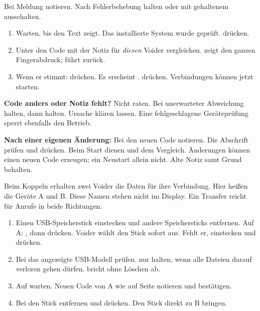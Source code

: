 Bei  Meldung notieren. Nach Fehlerbehebung  halten oder mit gehaltenem  ausschalten.

\begin{enumerate}
\item Warten, bis  den Text  zeigt. Das installierte System wurde geprüft.  drücken.
\item Unter  den Code mit der Notiz für \emph{diesen} Voider vergleichen.  zeigt den ganzen Fingerabdruck;  führt zurück.
\item Wenn er stimmt:  drücken. Es erscheint .  drücken. Verbindungen können jetzt starten.
\end{enumerate}
\textbf{Code anders oder Notiz fehlt?} Nicht raten. Bei unerwarteter Abweichung  halten, dann  halten. Ursache klären lassen. Eine fehlgeschlagene Geräteprüfung sperrt ebenfalls den Betrieb.

\textbf{Nach einer eigenen Änderung:} Bei  den neuen Code notieren. Die Abschrift prüfen und  drücken. Beim Start dienen  und  dem Vergleich. Änderungen können einen neuen Code erzeugen; ein Neustart allein nicht. Alte Notiz samt Grund behalten.

Beim Koppeln erhalten zwei Voider die Daten für ihre Verbindung. Hier heißen die Geräte A und B. Diese Namen stehen nicht im Display. Ein Transfer reicht für Anrufe in beide Richtungen.
\begin{enumerate}
\item Einen USB-Speicherstick einstecken und andere Speichersticks entfernen. Auf A: , dann  drücken. Voider wählt den Stick sofort aus. Fehlt er, einstecken und  drücken.
\item Bei  das angezeigte USB-Modell prüfen.  nur halten, wenn alle Dateien darauf verloren gehen dürfen.  bricht ohne Löschen ab.
\item Auf  warten. Neuen Code von A wie auf Seite \pageref{de:check} notieren und bestätigen.
\item Bei  den Stick entfernen und  drücken. Den Stick direkt zu B bringen.
\end{enumerate}

